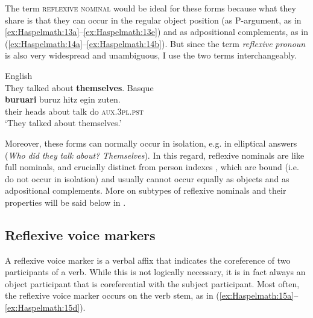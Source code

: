 \documentclass[output=paper]{langscibook}
\begin{document}
  The term \textsc{reflexive} \textsc{nominal} would be ideal for these forms because what they share is that they can occur in the regular object position (as P-argument, as in \ref{ex:Haspelmath:13a}--\ref{ex:Haspelmath:13e}) and as adpositional complements, as in (\ref{ex:Haspelmath:14a}--\ref{ex:Haspelmath:14b}). But since the term \textit{reflexive} \textit{pronoun} is also very widespread and unambiguous, I use the two terms interchangeably.

\ea%
    \label{ex:Haspelmath:14}
    \ea English\label{ex:Haspelmath:14a}\\
    {They} {talked} {about} \textbf{{themselves}}.
    \ex  Basque \label{ex:Haspelmath:14b}\\
      \textbf{{buruari}}  {buruz}  {hitz}  {egin}  {zuten.}\\
         their  heads  about  talk  do  \textsc{aux}.\textsc{3pl.pst}\\
    \glt ‘They talked about themselves.’
    \z
\z 
  
  

Moreover, these forms can normally occur in isolation, e.g. in elliptical answers (\textit{Who} \textit{did} \textit{they} \textit{talk} \textit{about?} \textit{Themselves}). In this regard, reflexive nominals are like full nominals, and crucially distinct from person indexes \citep{Haspelmath2013}, which are bound (i.e. do not occur in isolation) and usually cannot occur equally as objects and as adpositional complements. More on subtypes of reflexive nominals and their properties will be said below in .


\subsection{Reflexive voice markers}\label{sec:Haspelmath:5.2}

A reflexive voice marker is a verbal affix that indicates the coreference of two participants of a verb. While this is not logically necessary, it is in fact always an object participant that is coreferential with the subject participant. Most often, the reflexive voice marker occurs on the verb stem, as in (\ref{ex:Haspelmath:15a}--\ref{ex:Haspelmath:15d}). 
\end{document}
